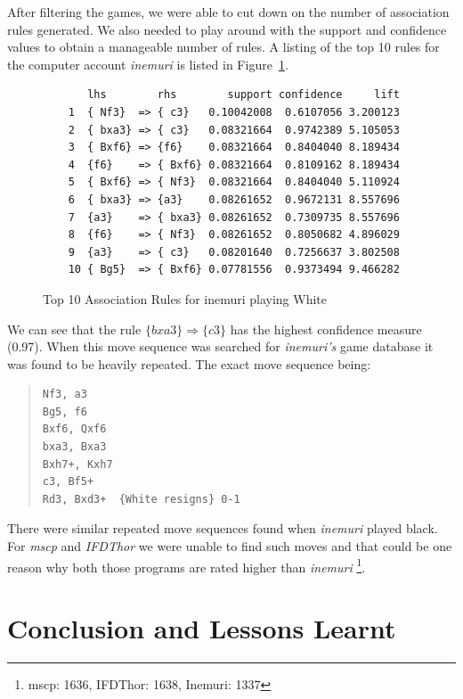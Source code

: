 \documentclass{article}
\begin{document}
After filtering the games, we were able to cut down on the number of association rules generated. We also needed to play around with the support and confidence values to obtain a manageable number of rules. A listing of the top 10 rules for the computer account {\sl inemuri} is listed in Figure~\ref{fig:inemuriwhite}.

\begin{figure}[htp]
\begin{verbatim}
       lhs        rhs        support confidence     lift
    1  { Nf3}  => { c3}   0.10042008  0.6107056 3.200123
    2  { bxa3} => { c3}   0.08321664  0.9742389 5.105053
    3  { Bxf6} => {f6}    0.08321664  0.8404040 8.189434
    4  {f6}    => { Bxf6} 0.08321664  0.8109162 8.189434
    5  { Bxf6} => { Nf3}  0.08321664  0.8404040 5.110924
    6  { bxa3} => {a3}    0.08261652  0.9672131 8.557696
    7  {a3}    => { bxa3} 0.08261652  0.7309735 8.557696
    8  {f6}    => { Nf3}  0.08261652  0.8050682 4.896029
    9  {a3}    => { c3}   0.08201640  0.7256637 3.802508
    10 { Bg5}  => { Bxf6} 0.07781556  0.9373494 9.466282
\end{verbatim}

\caption{Top 10 Association Rules for inemuri playing White}
\label{fig:inemuriwhite}
\end{figure}

We can see that the rule $\{bxa3\} \Rightarrow \{c3\}$ has the highest confidence measure (0.97). When this move sequence was searched for {\sl inemuri's} game database it was found to be heavily repeated. The exact move sequence being:

\begin{quote}
\begin{verbatim}
Nf3, a3 
Bg5, f6
Bxf6, Qxf6
bxa3, Bxa3
Bxh7+, Kxh7
c3, Bf5+
Rd3, Bxd3+  {White resigns} 0-1
\end{verbatim}
\end{quote}

There were similar repeated move sequences found when {\sl inemuri} played black. For {\sl mscp} and {\sl IFDThor} we were unable to find such moves and that could be one reason why both those programs are rated higher than {\sl inemuri} \footnote{mscp: 1636, IFDThor: 1638, Inemuri: 1337}.

\section{Conclusion and Lessons Learnt}
\label{sec:conc}
\end{document}
